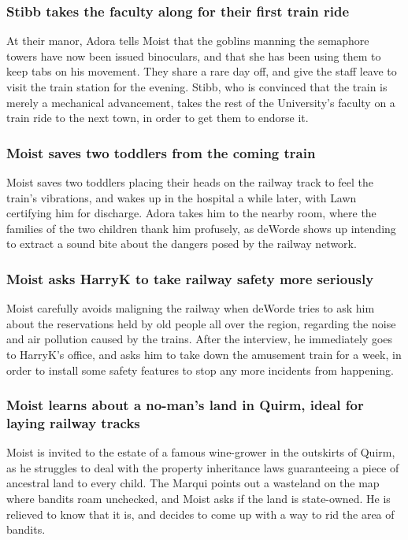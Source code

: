 \subsubsection{\Gls{Stibb} takes the faculty along for their first train ride}
At their manor, \Gls{Adora} tells \Gls{Moist} that the goblins manning the semaphore towers have
now been issued binoculars, and that she has been using them to keep tabs on his movement. They
share a rare day off, and give the staff leave to visit the train station for the evening.
\Gls{Stibb}, who is convinced that the train is merely a mechanical advancement, takes the rest of
the University's faculty on a train ride to the next town, in order to get them to endorse it.

\subsubsection{\Gls{Moist} saves two toddlers from the coming train}
\Gls{Moist} saves two toddlers placing their heads on the railway track to feel the train's
vibrations, and wakes up in the hospital a while later, with \Gls{Lawn} certifying him for
discharge. \Gls{Adora} takes him to the nearby room, where the families of the two children thank
him profusely, as \Gls{deWorde} shows up intending to extract a sound bite about the dangers posed
by the railway network.

\subsubsection{\Gls{Moist} asks \Gls{HarryK} to take railway safety more seriously}
\Gls{Moist} carefully avoids maligning the railway when \Gls{deWorde} tries to ask him about the
reservations held by old people all over the region, regarding the noise and air pollution caused
by the trains. After the interview, he immediately goes to \Gls{HarryK}'s office, and asks him to
take down the amusement train for a week, in order to install some safety features to stop any more
incidents from happening.

\subsubsection{\Gls{Moist} learns about a no-man's land in Quirm, ideal for laying railway tracks}
\Gls{Moist} is invited to the estate of a famous wine-grower in the outskirts of Quirm, as he
struggles to deal with the property inheritance laws guaranteeing a piece of ancestral land to every
child. The \Gls{Marqui} points out a wasteland on the map where bandits roam unchecked, and
\Gls{Moist} asks if the land is state-owned. He is relieved to know that it is, and decides to
come up with a way to rid the area of bandits.

